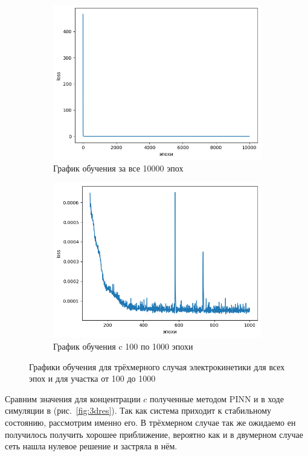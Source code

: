 \documentclass[a4paper,14pt]{extarticle} %
\def\oldcite{} \let\oldcite=\cite
\def\cite{\stepcounter{citesnum}\oldcite}
\begin{document}
\begin{figure}[h]
    \begin{subfigure}{0.49\textwidth}
        \center
        \includegraphics[width=\textwidth]{../plots/ek/3-dim loss 20x4.png}
        \caption{График обучения за все 10000 эпох}
        \label{fig:3dloss}
    \end{subfigure}
    \hfill
    \begin{subfigure}{0.49\textwidth}
        \center
        \includegraphics[width=\textwidth]{../plots/ek/3-dim loss trim20x4.png}
        \caption{График обучения c 100 по 1000 эпохи}
        \label{fig:3dloss_trim}
    \end{subfigure}
    \caption{Графики обучения для трёхмерного случая электрокинетики для всех эпох и для участка от 100 до 1000}
\end{figure}
Сравним значения для концентрации $c$ полученные методом PINN и в ходе симуляции в \cite{bib:tutor} (рис.~\ref{fig:3dres}). Так как система приходит к стабильному состоянию, рассмотрим именно его. В трёхмерном случае так же ожидаемо ен получилось получить хорошее приближение, вероятно как и в двумерном случае сеть нашла нулевое решение и застряла в нём.
\end{document}
